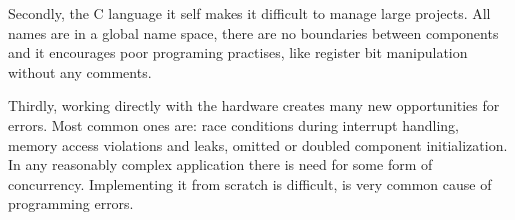 Secondly, the C language
it self makes it difficult to manage large projects. All names are in
a global name space, there are no boundaries between components and
it encourages poor programing practises, like register bit manipulation
without any comments.

Thirdly, working directly with the hardware
creates many new opportunities for errors. Most common ones are: race
conditions during interrupt handling, memory access violations and
leaks, omitted or doubled component initialization. In any reasonably
complex application there is need for some form of concurrency.
Implementing it from scratch is difficult, is very common cause of
programming errors. %








